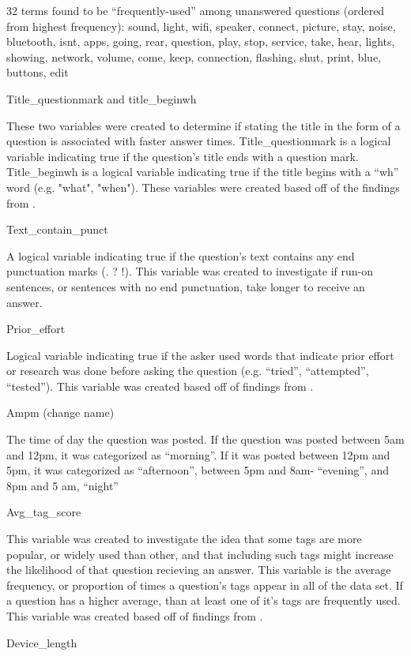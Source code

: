 \documentclass[12pt]{article}
\begin{document}
32 terms found to be ``frequently-used'' among unanswered questions (ordered from highest frequency):
sound, light, wifi, speaker, connect, picture, stay, noise, bluetooth, isnt, apps, going, rear, question, play, stop, service, take, hear, lights, showing, network, volume, come, keep, connection, flashing, shut, print, blue, buttons, edit
  
Title\_questionmark and title\_beginwh 

These two variables were created to determine if stating the title in the form of a question is associated with faster answer times. Title_questionmark is a logical variable indicating true if the question's title ends with a question mark. Title_beginwh is a logical variable indicating true if the title begins with a “wh” word (e.g. "what", "when"). These variables were created based off of the findings from \citep{Bhat2014}. 
  
  
Text\_contain\_punct

A logical variable indicating true if the question’s text contains any end punctuation marks (. ? !). This variable was created to investigate if run-on sentences, or sentences with no end punctuation, take longer to receive an answer. 

Prior\_effort 

Logical variable indicating true if the asker used words that indicate prior effort or research was done before asking the question (e.g. ``tried'', ``attempted'', ``tested''). This variable was created based off of findings from \cite{Bhat2014}. 

Ampm (change name)

The time of day the question was posted. If the question was posted between 5am and 12pm, it was categorized as ``morning''. If it was posted between 12pm and 5pm, it was categorized as ``afternoon'', between 5pm and 8am- ``evening'', and 8pm and 5 am, ``night''

Avg\_tag\_score

This variable was created to investigate the idea that some tags are more popular, or widely used than other, and that including such tags might increase the likelihood of that question recieving an answer. This variable is the average frequency, or proportion of times a question's tags appear in all of the data set. If a question has a higher average, than at least one of it's tags are frequently used. This variable was created based off of findings from \cite{Bhat2014}. 


Device\_length
\end{document}
